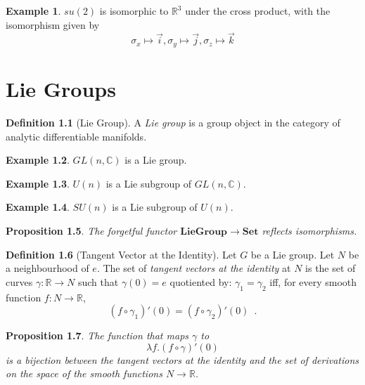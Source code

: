 \documentclass{book}
\newtheorem{prop}{Proposition}[chapter]
\theoremstyle{definition}
\newtheorem{df}[prop]{Definition}
\newtheorem{ex}[prop]{Example}
\newcommand{\Set}{\ensuremath{\mathbf{Set}}}
\begin{document}

\begin{ex}
$su(2)$ is isomorphic to $\mathbb{R}^3$ under the cross product, with the isomorphism given by
\[ \sigma_x \mapsto \vec{i}, \sigma_y \mapsto \vec{j}, \sigma_z \mapsto \vec{k} \]
\end{ex}

\chapter{Lie Groups}

\begin{df}[Lie Group]
A \emph{Lie group} is a group object in the category of analytic differentiable manifolds.
\end{df}

\begin{ex}
$GL(n,\mathbb{C})$ is a Lie group.
\end{ex}

\begin{ex}
$U(n)$ is a Lie subgroup of $GL(n,\mathbb{C})$.
\end{ex}

\begin{ex}
$SU(n)$ is a Lie subgroup of $U(n)$.
\end{ex}

\begin{prop}
The forgetful functor $\mathbf{LieGroup} \rightarrow \Set$ reflects isomorphisms.
\end{prop}


\begin{df}[Tangent Vector at the Identity]
Let $G$ be a Lie group. Let $N$ be a neighbourhood of $e$. The set of \emph{tangent vectors at the identity} at $N$ is the set of curves $\gamma : \mathbb{R} \rightarrow N$ such that $\gamma(0) = e$ quotiented by: $\gamma_1 = \gamma_2$ iff, for every smooth function $f : N \rightarrow \mathbb{R}$,
\[ (f \circ \gamma_1)'(0) = (f \circ \gamma_2)'(0) \enspace . \]
\end{df}

\begin{prop}
The function that maps $\gamma$ to
\[ \lambda f. (f \circ \gamma)'(0) \]
 is a bijection between the tangent vectors at the identity and the set of derivations on the space of the smooth functions $N \rightarrow \mathbb{R}$.
 \end{prop}
 
 
\end{document}
